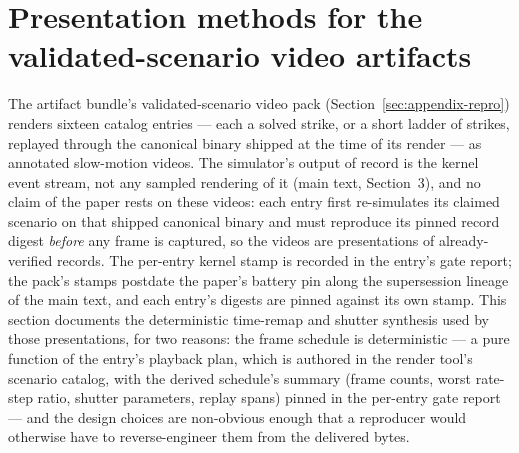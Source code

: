 \section{Presentation methods for the validated-scenario video artifacts}
\label{sec:supp-timeremap}

The artifact bundle's validated-scenario video pack
(Section~\ref{sec:appendix-repro}) renders sixteen catalog entries ---
each a solved strike, or a short ladder of strikes, replayed through the
canonical binary shipped at the time of its render --- as annotated
slow-motion videos. The simulator's output of record is the
kernel event stream, not any sampled rendering of it (main text,
Section~3), and no claim of the paper rests on these videos: each entry
first re-simulates its claimed scenario on that shipped canonical binary
and must reproduce its pinned record digest \emph{before} any frame is
captured, so the videos are presentations of already-verified records.
The per-entry kernel stamp is recorded in the entry's gate report; the
pack's stamps postdate the paper's battery pin along the supersession
lineage of the main text, and each entry's digests are pinned against
its own stamp.
This section documents the deterministic time-remap and shutter
synthesis used by those presentations, for two reasons: the frame
schedule is deterministic --- a pure function of the entry's playback
plan, which is authored in the render tool's scenario catalog, with the
derived schedule's summary (frame counts, worst rate-step ratio,
shutter parameters, replay spans) pinned in the per-entry gate
report --- and the design choices are
non-obvious enough that a reproducer would otherwise have to
reverse-engineer them from the delivered bytes.

